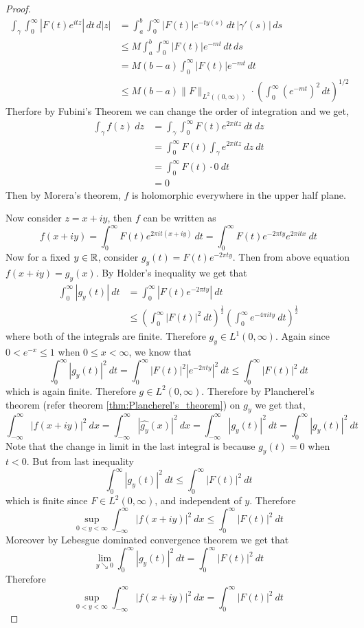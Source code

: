\begin{proof}
  \begin{align*}
    \int_{\gamma}\int_{0}^{\infty}|F(t)e^{itz}|\,dt\,d|z|&=
    \int_a^b\int_{0}^{\infty}|F(t)|e^{-ty(s)}\,dt\,|\gamma'(s)|\,ds\\
    &\leq M\int_a^b\int_{0}^{\infty}|F(t)|e^{-mt}\,dt\,ds\\
    &=M(b-a)\int_{0}^{\infty}|F(t)|e^{-mt}\,dt\\
    &\leq M(b-a)\|F\|_{L^2((0,\infty))}\cdot\left(\int_{0}^{\infty}(e^{-mt})^2\,dt\right)^{1/2}
  \end{align*}
  Therfore by Fubini's Theorem we can change the order of integration and we get, 
  \begin{align*}
    \int_\gamma f(z)\ dz &= \int_\gamma \int_0^\infty F(t) e^{2\pi i t z} \ dt \ dz \\
    & = \int_0^\infty F(t) \int_\gamma e^{2\pi itz} \ dz \ dt \\
    & = \int_0^\infty F(t) \cdot 0 \ dt \\
    & = 0
  \end{align*}
  Then by Morera's theorem, $f$ is holomorphic everywhere in the upper half plane.

  Now consider $z=x+iy$, then $f$ can be written as $$f(x+iy) = \int_0^\infty F(t)e^{2\pi i t (x+iy)}\ dt = \int_0^\infty F(t)e^{-2\pi ty}e^{2\pi i tx} \ dt$$ 
  Now for a fixed $y \in \mathbb R$, consider $g_y(t) = F(t)e^{-2\pi ty}$. Then from above equation $f(x+iy) = \widehat{g_y}(x)$. By Holder's inequality we get that 
  \begin{align*}
    \int_0^\infty |g_y(t)| \ dt &= \int_0^\infty \left|F(t)e^{-2\pi ty}\right| \ dt \\
    &\le \left(\int_0^\infty \left|F(t)\right|^2 \ dt \right)^{\frac{1}{2}} \left(\int_0^\infty e^{-4\pi ity} \ dt \right)^{\frac{1}{2}}
  \end{align*}
  where both of the integrals are finite. Therefore $g_y \in L^1(0, \infty)$. Again since $0<e^{-x}\le1$ when $0\le x<\infty$, we know that $$\int_0^\infty |g_y(t)|^2 \ dt = \int_0^\infty \left|F(t)\right|^2 \left| e^{-2\pi ty} \right|^2 \ dt \le \int_0^\infty \left|F(t)\right|^2 \ dt$$
  which is again finite. Therefore $g\in L^2(0, \infty)$. Therefore by Plancherel's theorem (refer theorem \ref{thm:Plancherel's_theorem}) on $g_y$ we get that, $$\int_{-\infty}^{\infty}\left|f(x+iy)\right|^2 \ dx = \int_{-\infty}^{\infty} \left|\widehat{g_y}(x)\right|^2 \ dx= \int_{-\infty}^{\infty} \left|g_y(t)\right|^2 \ dt = \int_0^\infty \left|g_y(t)\right|^2 \ dt $$
Note that the change in limit in the last integral is because $g_y(t) = 0$ when $t < 0$. But from last inequality $$\int_0^\infty \left|g_y(t)\right|^2 \ dt \le \int_0^\infty \left|F(t)\right|^2 \ dt$$
  which is finite since $F \in L^2(0, \infty)$, and independent of $y$. Therefore $$\sup_{0<y<\infty} \int_{-\infty}^\infty \left|f(x+iy)\right|^2 \ dx \le \int_0^\infty \left|F(t)\right|^2 \ dt $$
  Moreover by Lebesgue dominated convergence theorem we get that $$\lim_{y \searrow 0} \int_0^\infty |g_y(t)|^2 \ dt = \int_0^\infty |F(t)|^2 \ dt$$
  Therefore $$\sup_{0<y<\infty} \int_{-\infty}^\infty \left|f(x+iy)\right|^2 \ dx = \int_0^\infty \left|F(t)\right|^2 \ dt $$
\end{proof}

